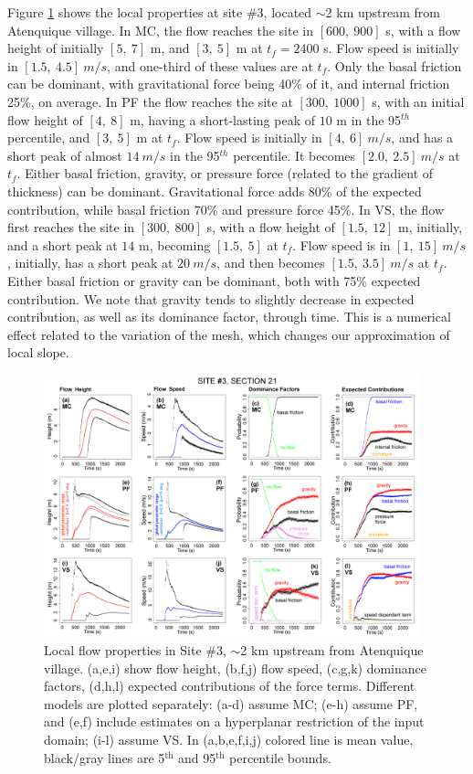 \documentclass[nhess, manuscript]{copernicus}
\begin{document}
Figure \ref{Fig5} shows the local properties at site \#3, located $\sim$2 km upstream from Atenquique village. In MC, the flow reaches the site in $[600,\ 900]$ s, with a flow height of initially $[5,\ 7]$ m, and $[3,\ 5]$ m at $t_f=2400$ s. Flow speed is initially in $[1.5,\ 4.5]\ m/s$, and  one-third of these values are at $t_f$. Only the basal friction can be dominant, with gravitational force being 40\% of it, and internal friction 25\%, on average. In PF the flow reaches the site at $[300,\ 1000]$ s, with an initial flow height of  $[4,\ 8]$ m, having a short-lasting peak of $10$ m in the 95$^{th}$ percentile, and $[3,\ 5]$ m at $t_f$. Flow speed is initially in $[4,\ 6]\ m/s$, and has a short peak of almost $14\ m/s$ in the 95$^{th}$ percentile. It becomes $[2.0,\ 2.5]\ m/s$ at $t_f$. Either basal friction, gravity, or pressure force (related to the gradient of thickness) can be dominant. Gravitational force adds 80\% of the expected contribution, while basal friction 70\% and pressure force 45\%. In VS, the flow first reaches the site in $[300,\ 800]$ s, with a flow height of $[1.5,\ 12]$ m, initially, and a short peak at $14$ m, becoming $[1.5,\ 5]$ at $t_f$. Flow speed is in $[1,\ 15]\ m/s$, initially, has a short peak at $20\ m/s$, and then becomes $[1.5,\ 3.5]\ m/s$ at $t_f$. Either basal friction or gravity can be dominant, both with 75\% expected contribution. We note that gravity tends to slightly decrease in expected contribution, as well as its dominance factor, through time. This is a numerical effect related to the variation of the mesh, which changes our approximation of local slope.
\begin{figure}[H]
\centering
\includegraphics[width=0.97\textwidth]{Fig5.png}
\caption{Local flow properties in Site \#3, $\sim$2 km upstream from Atenquique village. (a,e,i) show flow height, (b,f,j) flow speed, (c,g,k) dominance factors, (d,h,l) expected contributions of the force terms. Different models are plotted separately: (a-d) assume MC; (e-h) assume PF, and (e,f) include estimates on a hyperplanar restriction of the input domain; (i-l) assume VS. In (a,b,e,f,i,j) colored line is mean value, black/gray lines are 5$^{\mathrm{th}}$ and 95$^{\mathrm{th}}$ percentile bounds.}
\label{Fig5}
\end{figure}
\end{document}
